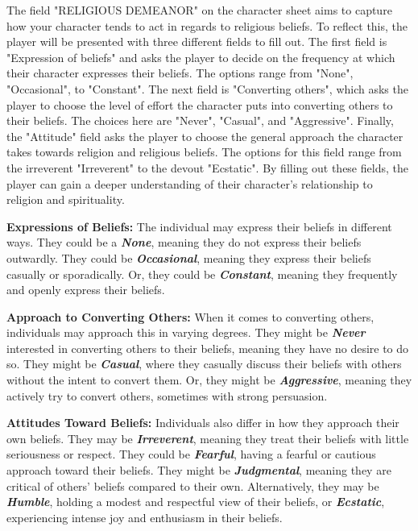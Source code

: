 \documentclass[12pt]{book}
\begin{document}
The field "RELIGIOUS DEMEANOR" on the character sheet aims to capture how your character tends to act in regards to religious beliefs. To reflect this, the player will be presented with three different fields to fill out. The first field is "Expression of beliefs" and asks the player to decide on the frequency at which their character expresses their beliefs. The options range from "None", "Occasional", to "Constant". The next field is "Converting others", which asks the player to choose the level of effort the character puts into converting others to their beliefs. The choices here are "Never", "Casual", and "Aggressive". Finally, the "Attitude" field asks the player to choose the general approach the character takes towards religion and religious beliefs. The options for this field range from the irreverent "Irreverent" to the devout "Ecstatic". By filling out these fields, the player can gain a deeper understanding of their character's relationship to religion and spirituality.

\textbf{Expressions of Beliefs:} The individual may express their beliefs in different ways. They could be a \textbf{\textit{None}}, meaning they do not express their beliefs outwardly. They could be \textbf{\textit{Occasional}}, meaning they express their beliefs casually or sporadically. Or, they could be \textbf{\textit{Constant}}, meaning they frequently and openly express their beliefs.

\textbf{Approach to Converting Others:} When it comes to converting others, individuals may approach this in varying degrees. They might be \textbf{\textit{Never}} interested in converting others to their beliefs, meaning they have no desire to do so. They might be \textbf{\textit{Casual}}, where they casually discuss their beliefs with others without the intent to convert them. Or, they might be \textbf{\textit{Aggressive}}, meaning they actively try to convert others, sometimes with strong persuasion.

\textbf{Attitudes Toward Beliefs:} Individuals also differ in how they approach their own beliefs. They may be \textbf{\textit{Irreverent}}, meaning they treat their beliefs with little seriousness or respect. They could be \textbf{\textit{Fearful}}, having a fearful or cautious approach toward their beliefs. They might be \textbf{\textit{Judgmental}}, meaning they are critical of others’ beliefs compared to their own. Alternatively, they may be \textbf{\textit{Humble}}, holding a modest and respectful view of their beliefs, or \textbf{\textit{Ecstatic}}, experiencing intense joy and enthusiasm in their beliefs.
\end{document}
